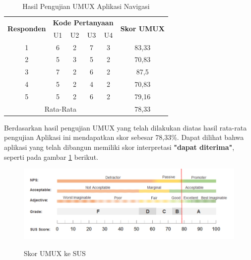 \begin{table}[H]
\caption{Hasil Pengujian UMUX Aplikasi Navigasi}
\label{tab:skor-umux}
\centering
\begin{tabular}{|ccccc|c|}
\hline
\multicolumn{1}{|c|}{\multirow{2}{*}{\textbf{Responden}}} & \multicolumn{4}{c|}{\textbf{Kode Pertanyaan}} & \multirow{2}{*}{\textbf{Skor UMUX}} \\ \cline{2-5}
\multicolumn{1}{|c|}{}  & \multicolumn{1}{c|}{U1} & \multicolumn{1}{c|}{U2} & \multicolumn{1}{c|}{U3} & U4 &       \\ \hline
\multicolumn{1}{|c|}{1} & \multicolumn{1}{c|}{6}  & \multicolumn{1}{c|}{2}  & \multicolumn{1}{c|}{7}  & 3  & 83,33 \\ \hline
\multicolumn{1}{|c|}{2} & \multicolumn{1}{c|}{5}  & \multicolumn{1}{c|}{3}  & \multicolumn{1}{c|}{5}  & 2  & 70,83 \\ \hline
\multicolumn{1}{|c|}{3} & \multicolumn{1}{c|}{7}  & \multicolumn{1}{c|}{2}  & \multicolumn{1}{c|}{6}  & 2  & 87,5  \\ \hline
\multicolumn{1}{|c|}{4} & \multicolumn{1}{c|}{5}  & \multicolumn{1}{c|}{2}  & \multicolumn{1}{c|}{4}  & 2  & 70,83 \\ \hline
\multicolumn{1}{|c|}{5} & \multicolumn{1}{c|}{5}  & \multicolumn{1}{c|}{2}  & \multicolumn{1}{c|}{6}  & 2  & 79,16 \\ \hline
\multicolumn{5}{|c|}{Rata-Rata}                                                                            & 78,33       \\ \hline
\end{tabular}
\end{table}

\par Berdasarkan hasil pengujian UMUX yang telah dilakukan diatas hasil rata-rata pengujian Aplikasi ini mendapatkan skor sebesar 78,33\%. Dapat dilihat bahwa aplikasi yang telah dibangun memiliki skor interpretasi \textbf{"dapat diterima"}, seperti pada gambar \ref{img:umux_to_sus} berikut.

\begin{figure}[H]
\centering
{\includegraphics [scale = 0.5]{gambar/bab4/umux-to-sus}}
\caption{Skor UMUX ke SUS}
\label{img:umux_to_sus}
\end{figure}


